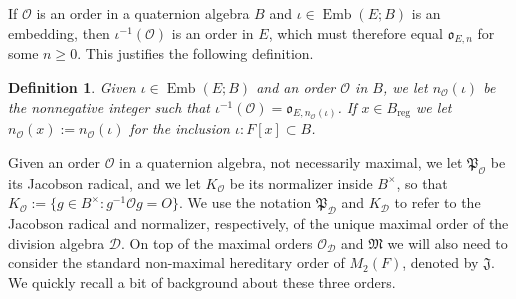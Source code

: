 \documentclass{article}
\newtheorem{defi}[lem]{Definition}
\theoremstyle{named}
\newcommand{\D}{\mathcal{D}}
\newcommand{\M}{\mathfrak{M}}
\newcommand{\J}{\mathfrak{J}}
\renewcommand{\O}{\mathcal{O}}
\renewcommand{\o}{\mathfrak{o}}
\renewcommand{\P}{\mathfrak{P}}
\DeclareMathOperator{\reg}{reg}
\DeclareMathOperator{\Emb}{Emb}
\begin{document}
If $\O$ is an order in a quaternion algebra $B$ and $\iota \in \Emb(E; B)$ is an embedding, then $\iota^{-1}(\O)$ is an order in $E$, which must therefore equal $\o_{E, n}$ for some $n\geq 0$. This justifies the following definition.
\begin{defi}
Given $\iota \in \Emb(E; B)$ and an order $\O$ in $B$, we let $n_\O(\iota)$ be the nonnegative integer such that $\iota^{-1}(\O) = \o_{E, n_\O(\iota)}$. If $x \in B_{\reg}$ we let $n_\O(x) := n_\O(\iota)$ for the inclusion $\iota: F[x] \subset B$.
\end{defi}
Given an order $\O$ in a quaternion algebra, not necessarily maximal, we let $\P_\O$ be its Jacobson radical, and we let $K_\O$ be its normalizer inside $B^\times$, so that $K_\O := \{g \in B^\times : g^{-1}\O g= O\}$. We use the notation $\P_\D$ and $K_\D$ to refer to the Jacobson radical and normalizer, respectively, of the unique maximal order of the division algebra $\D$. On top of the maximal orders $\O_\D$ and $\M$ we will also need to consider the standard non-maximal hereditary order of $M_2(F)$, denoted by $\J$. We quickly recall a bit of background about these three orders. 
\end{document}
